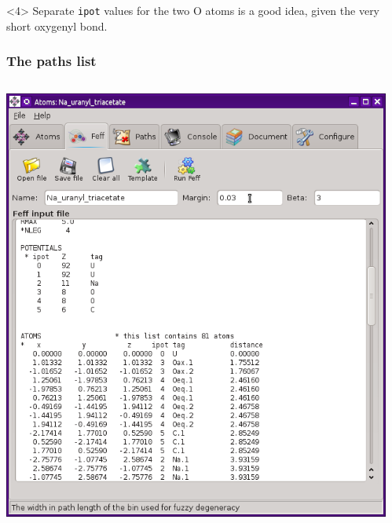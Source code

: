 \documentclass[10pt, xcolor=x11names, compress]{beamer}
\begin{document}
\begin{frame}[fragile]
\begin{columns}[T]
\begin{column}{0.5\linewidth}
    \end{column}
  \end{columns}
  \begin{block}<4>{}
    Separate \texttt{ipot} values for the two O atoms is a good idea,
    given the very short oxygenyl bond.
  \end{block}
\end{frame}

\begin{frame}
  \frametitle{The paths list}
  \begin{columns}[T]
    \begin{column}{0.5\linewidth}
      \begin{center}
        \includegraphics[width=0.85\linewidth]{images/feffinp.png}
      \end{center}
    \end{column}
    \begin{column}{0.5\linewidth}
      \begin{center}

\end{center}
\end{column}
\end{columns}
\end{frame}
\end{document}
